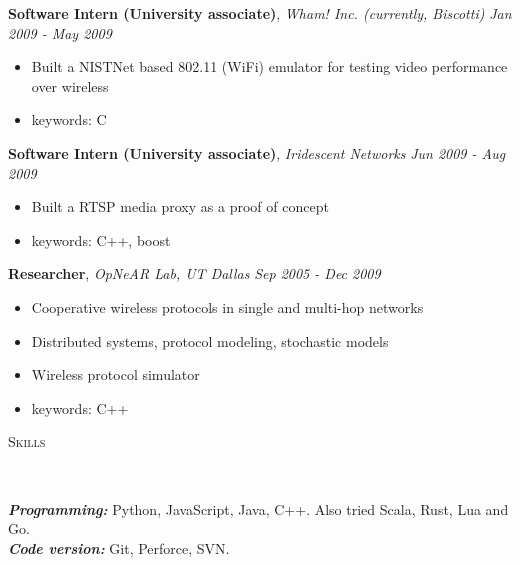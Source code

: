 \documentclass[9pt]{article}
\newenvironment{changemargin}[2]{%
  \begin{list}{}{%
    \setlength{\topsep}{0pt}%
    \setlength{\leftmargin}{#1}%
    \setlength{\rightmargin}{#2}%
    \setlength{\listparindent}{\parindent}%
    \setlength{\itemindent}{\parindent}%
    \setlength{\parsep}{\parskip}%
  }%
  \item[]}{\end{list}
}
\newcommand{\lineover}{
	\begin{changemargin}{-0.05in}{-0.05in}
		\vspace*{-8pt}
		\hrulefill \\
		\vspace*{-2pt}
	\end{changemargin}
}
\newcommand{\header}[1]{
	\begin{changemargin}{-0.5in}{-0.5in}
		\scshape{#1}\\
  	\lineover
	\end{changemargin}
}
\newenvironment{body} {
	\vspace*{-16pt}
	\begin{changemargin}{-0.25in}{-0.5in}
  }
	{\end{changemargin}
}
\begin{document}
\begin{body}
  \textbf {Software Intern (University associate)}, \emph{Wham! Inc. (currently, Biscotti)} \hfill \emph{Jan 2009 - May 2009}\\
	\begin{itemize} \itemsep -0pt
    \item Built a NISTNet based 802.11 (WiFi) emulator for testing video performance over wireless
    \item keywords: C
	\end{itemize}

  \textbf {Software Intern (University associate)}, \emph{Iridescent Networks} \hfill \emph{Jun 2009 - Aug 2009}\\
	\begin{itemize} \itemsep -0pt
    \item Built a RTSP media proxy as a proof of concept
    \item keywords: C++, boost
	\end{itemize}

  \textbf {Researcher}, \emph{OpNeAR Lab, UT Dallas} \hfill \emph{Sep 2005 - Dec 2009}\\
  \vspace*{-4pt}
  \begin{itemize} \itemsep -0pt
    \item Cooperative wireless protocols in single and multi-hop networks
    \item Distributed systems, protocol modeling, stochastic models
    \item Wireless protocol simulator
    \item keywords: C++
  \end{itemize}

\end{body}

\smallskip


\header{Skills}

\begin{body}
	\vspace{14pt}
	\emph{\textbf{Programming:}}{} Python, JavaScript, Java, C++. Also tried Scala, Rust, Lua and Go.\\
  \emph{\textbf{Code version:}}{} Git, Perforce, SVN.\\
\end{body}

\smallskip
\end{document}
